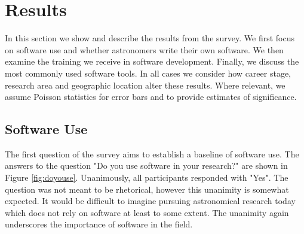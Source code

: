 \section{Results}
\label{sec:res}

In this section we show and describe the results from the survey. We first focus on software use and whether astronomers write their own software. We then examine the training we receive in software development. Finally, we discuss the most commonly used software tools. In all cases we consider how career stage, research area and geographic location alter these results. Where relevant, we assume Poisson statistics for error bars and to provide estimates of significance.

\subsection{Software Use}

The first question of the survey aims to establish a baseline of software use. The answers to the question "Do you use software in your research?" are shown in Figure \ref{fig:doyouse}. Unanimously, all participants responded with "Yes". The question was not meant to be rhetorical, however this unanimity is somewhat expected. It would be difficult to imagine pursuing astronomical research today which does not rely on software at least to some extent. The unanimity again underscores the importance of software in the field.
    